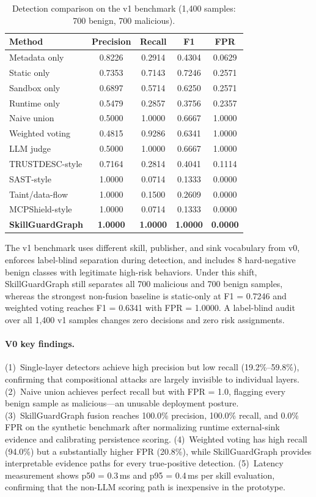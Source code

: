 \documentclass[10pt]{article}
\begin{document}
\begin{table}[t]
\centering
\caption{Detection comparison on the v1 benchmark (1{,}400 samples: 700 benign, 700 malicious).}
\label{tab:detection_v1}
\begin{tabular}{lcccc}
\toprule
Method & Precision & Recall & F1 & FPR \\
\midrule
Metadata only & 0.8226 & 0.2914 & 0.4304 & 0.0629 \\
Static only & 0.7353 & 0.7143 & 0.7246 & 0.2571 \\
Sandbox only & 0.6897 & 0.5714 & 0.6250 & 0.2571 \\
Runtime only & 0.5479 & 0.2857 & 0.3756 & 0.2357 \\
\midrule
Naive union & 0.5000 & 1.0000 & 0.6667 & 1.0000 \\
Weighted voting & 0.4815 & 0.9286 & 0.6341 & 1.0000 \\
LLM judge & 0.5000 & 1.0000 & 0.6667 & 1.0000 \\
TRUSTDESC-style & 0.7164 & 0.2814 & 0.4041 & 0.1114 \\
SAST-style & 1.0000 & 0.0714 & 0.1333 & 0.0000 \\
Taint/data-flow & 1.0000 & 0.1500 & 0.2609 & 0.0000 \\
MCPShield-style & 1.0000 & 0.0714 & 0.1333 & 0.0000 \\
\midrule
\textbf{SkillGuardGraph} & \textbf{1.0000} & \textbf{1.0000} & \textbf{1.0000} & \textbf{0.0000} \\
\bottomrule
\end{tabular}
\end{table}

The v1 benchmark uses different skill, publisher, and sink vocabulary from v0,
enforces label-blind separation during detection, and includes 8 hard-negative
benign classes with legitimate high-risk behaviors. Under this shift,
SkillGuardGraph still separates all 700 malicious and 700 benign samples,
whereas the strongest non-fusion baseline is static-only at F1 = 0.7246 and
weighted voting reaches F1 = 0.6341 with FPR = 1.0000. A label-blind audit over
all 1{,}400 v1 samples changes zero decisions and zero risk assignments.

\paragraph{V0 key findings.}
(1)~Single-layer detectors achieve high precision but low recall (19.2\%--59.8\%), confirming that compositional attacks are largely invisible to individual layers.
(2)~Naive union achieves perfect recall but with FPR = 1.0, flagging every benign sample as malicious---an unusable deployment posture.
(3)~SkillGuardGraph fusion reaches 100.0\% precision, 100.0\% recall, and 0.0\% FPR on the synthetic benchmark after normalizing runtime external-sink evidence and calibrating persistence scoring.
(4)~Weighted voting has high recall (94.0\%) but a substantially higher FPR (20.8\%), while SkillGuardGraph provides interpretable evidence paths for every true-positive detection.
(5)~Latency measurement shows p50 = 0.3\,ms and p95 = 0.4\,ms per skill evaluation, confirming that the non-LLM scoring path is inexpensive in the prototype.
\end{document}
